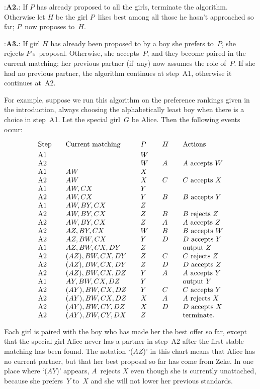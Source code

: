 \display 30pt:{\bf A2.}:
If $P$ has already proposed to all the girls, terminate the algorithm. 
Otherwise let $H$ be the girl $P$~likes best among all those he hasn't
approached so far; $P$~now proposes to~$H$.

\display 30pt:{\bf A3.}:
If girl $H$ has already been proposed to by a boy she prefers to~$P$,
she rejects $P$'s~proposal. Otherwise, 
she accepts~$P$, and they become paired in the current matching;
her previous partner (if~any) now assumes the role of~$P$.
If she had no previous partner, the algorithm continues at step~A1,
otherwise it continues at~A2.\nobreak\quad\pfbox

\vfill\eject

For example, suppose we run this algorithm on the preference rankings given
in the introduction, 
always choosing the alphabetically least boy when there is a choice
in step~A1. 
Let the special girl~$G$ be Alice. Then the following events occur:

\smallskip
$$\vcenter{\halign{#\hfil\qquad&$#$\hfil\qquad
&$#\hfil$\qquad&$#$\hfil\qquad&#\hfil\cr
Step&\hbox{\rm Current matching}&P&H&Actions\cr
\noalign{\smallskip}
A1&&W\cr
A2&&W&A&$A$ accepts $W$\cr
A1&AW&X\cr
A2&AW&X&C&$C$ accepts $X$\cr
A1&AW,CX&Y\cr
A2&AW,CX&Y&B&$B$ accepts $Y$\cr
A1&AW,BY,CX&Z\cr
A2&AW,BY,CX&Z&B&$B$ rejects $Z$\cr
A2&AW,BY,CX&Z&A&$A$ accepts $Z$\cr
A2&AZ,BY,CX&W&B&$B$ accepts $W$\cr
A2&AZ,BW,CX&Y&D&$D$ accepts $Y$\cr
A1&AZ,BW,CX,DY&Z&&output $Z$\cr
A2&(AZ),BW,CX,DY&Z&C&$C$ rejects $Z$\cr
A2&(AZ),BW,CX,DY&Z&D&$D$ accepts $Z$\cr
A2&(AZ),BW,CX,DZ&Y&A&$A$ accepts $Y$\cr
A1&AY,BW,CX,DZ&Y&&output $Y$\cr
A2&(AY),BW,CX,DZ&Y&C&$C$ accepts $Y$\cr
A2&(AY),BW,CX,DZ&X&A&$A$ rejects $X$\cr
A2&(AY),BW,CY,DZ&X&D&$D$ accepts $X$\cr
A2&(AY),BW,CY,DX&Z&&terminate.\cr
}}$$

\smallskip
Each girl is paired with the boy who has made her the best offer so far,
except that the special girl Alice never has a partner in step~A2
after the first stable matching has been found. The notation `($AZ$)'
in this chart means that Alice has no current partner, but that her best
proposal so far has come from Zeke. In one place where `($AY$)' appears,
$A$~rejects $X$ even though she is currently unattached, because she
prefers~$Y$ to~$X$ and she will not lower her previous standards.

